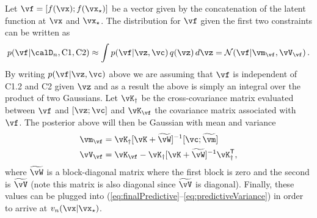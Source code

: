 Let $\vf=[f(\vx); f(\xopt)]$ be a vector given by the concatenation of the
latent function at $\x$ and $\xopt$. The distribution for $\vf$ given the first
two constraints can be written as 
\begin{equation}
    p(\vf|\D_n,\C1,\C2)
    \approx
    \int p(\vf|\vz,\vc) \,q(\vz) \,d\vz = \Normal(\vf|\vm_\vf,\vV_\vf)\,.
\end{equation}
By writing $p(\vf|\vz,\vc)$ above we are assuming that $\vf$ is independent of
C1.2 and C2 given $\vz$ and as a result the above is simply an integral over the
product of two Gaussians. Let $\vK_\dagger$ be the cross-covariance matrix
evaluated between $\vf$ and $[\vz;\vc]$ and $\vK_\vf$ the covariance matrix
associated with $\vf$.  The posterior above will then be Gaussian with mean and
variance
\begin{align*}
    \vm_\vf &= \vK_\dagger [ \vK + \widetilde\vW]^{-1} [\vc; \widetilde\vm] \\
    \vV_\vf &= \vK_\vf - \vK_\dagger [\vK + \widetilde\vW]^{-1}\vK_\dagger\T,
\end{align*}
where $\widetilde\vW$ is a block-diagonal matrix where the first block is zero
and the second is $\widetilde\vV$ (note this matrix is also diagonal since
$\widetilde\vV$ is diagonal). Finally, these values can be plugged into
(\ref{eq:finalPredictive}--\ref{eq:predictiveVariance}) in order to arrive at
$v_n(\x|\xopt)$.

